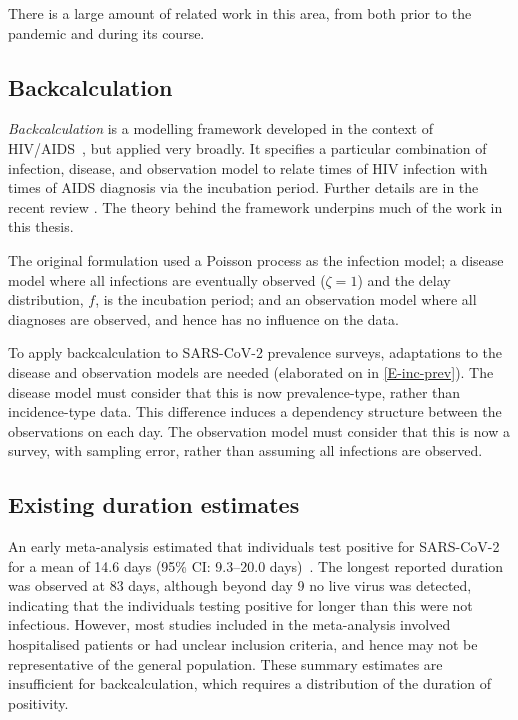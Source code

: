 \documentclass[thesis.tex]{subfiles}
\begin{document}
There is a large amount of related work in this area, from both prior to the pandemic and during its course.

\subsection{Backcalculation}

\emph{Backcalculation} is a modelling framework developed in the context of HIV/AIDS~\autocite{brookmeyerMethod}, but applied very broadly.
It specifies a particular combination of infection, disease, and observation model to relate times of HIV infection with times of AIDS diagnosis via the incubation period.
Further details are in the recent review \textcite{sunModeling}.
The theory behind the framework underpins much of the work in this thesis.

The original formulation used a Poisson process as the infection model; a disease model where all infections are eventually observed ($\zeta = 1$) and the delay distribution, $f$, is the incubation period; and an observation model where all diagnoses are observed, and hence has no influence on the data.

To apply backcalculation to SARS-CoV-2 prevalence surveys, adaptations to the disease and observation models are needed (elaborated on in \cref{E-inc-prev}).
The disease model must consider that this is now prevalence-type, rather than incidence-type data.
This difference induces a dependency structure between the observations on each day.
The observation model must consider that this is now a survey, with sampling error, rather than assuming all infections are observed.

\subsection{Existing duration estimates} \label{intro:sec:previous-duration-estimates}

An early meta-analysis estimated that individuals test positive for SARS-CoV-2 for a mean of 14.6 days (95\% CI: 9.3--20.0 days)~\autocite{cevikShedding}.
The longest reported duration was observed at 83 days, although beyond day 9 no live virus was detected, indicating that the individuals testing positive for longer than this were not infectious.
However, most studies included in the meta-analysis involved hospitalised patients or had unclear inclusion criteria, and hence may not be representative of the general population.
These summary estimates are insufficient for backcalculation, which requires a distribution of the duration of positivity.
\end{document}
